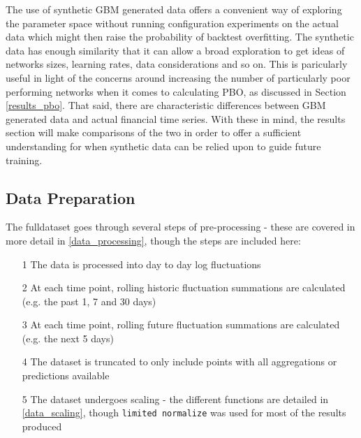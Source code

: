 \documentclass[a4paper,11pt,oneside]{article}
\theoremstyle{plain}
\theoremstyle{definition}
\begin{document}
	The use of synthetic GBM generated data offers a convenient way of exploring the parameter space without running configuration experiments on the actual data which might then raise the probability of backtest overfitting. The synthetic data has enough similarity that it can allow a broad exploration to get ideas of networks sizes, learning rates, data considerations and so on. This is paricularly useful in light of the concerns around increasing the number of particularly poor performing networks when it comes to calculating PBO, as discussed in Section \ref{results_pbo}. That said, there are characteristic differences between GBM generated data and actual financial time series. With these in mind, the results section will make comparisons of the two in order to offer a sufficient understanding for when synthetic data can be relied upon to guide future training.
	
	\subsection{Data Preparation}\label{proc_dataprep}
	
	The fulldataset goes through several steps of pre-processing - these are covered in more detail in \ref{data_processing}, though the steps are included here:
	
	\begin{itemize}
		\item[1] The data is processed into day to day log fluctuations
		\item[2] At each time point, rolling historic fluctuation summations are calculated (e.g. the past 1, 7 and 30 days)
		\item[3] At each time point, rolling future fluctuation summations are calculated (e.g. the next 5 days)
		\item[4] The dataset is truncated to only include points with all aggregations or predictions available
		\item[5] The dataset undergoes scaling - the different functions are detailed in \ref{data_scaling}, though \texttt{limited normalize} was used for most of the results produced
	\end{itemize}
	
\end{document}
